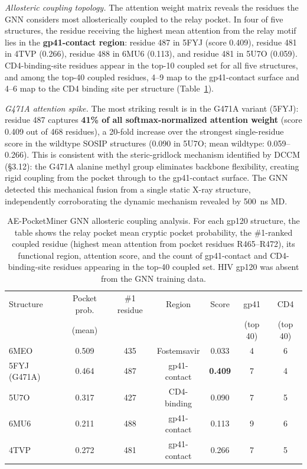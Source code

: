 \documentclass[11pt,a4paper]{article}
\begin{document}
\textit{Allosteric coupling topology.} The attention weight matrix reveals the residues the GNN considers most allosterically coupled to the relay pocket. In four of five structures, the residue receiving the highest mean attention from the relay motif lies in the \textbf{gp41-contact region}: residue 487 in 5FYJ (score 0.409), residue 481 in 4TVP (0.266), residue 488 in 6MU6 (0.113), and residue 481 in 5U7O (0.059). CD4-binding-site residues appear in the top-10 coupled set for all five structures, and among the top-40 coupled residues, 4--9 map to the gp41-contact surface and 4--6 map to the CD4 binding site per structure (Table~\ref{tab:gnn_coupling}).

\textit{G471A attention spike.} The most striking result is in the G471A variant (5FYJ): residue 487 captures \textbf{41\% of all softmax-normalized attention weight} (score 0.409 out of 468 residues), a 20-fold increase over the strongest single-residue score in the wildtype SOSIP structures (0.090 in 5U7O; mean wildtype: 0.059--0.266). This is consistent with the steric-gridlock mechanism identified by DCCM (\S3.12): the G471A alanine methyl group eliminates backbone flexibility, creating rigid coupling from the pocket through to the gp41-contact surface. The GNN detected this mechanical fusion from a single static X-ray structure, independently corroborating the dynamic mechanism revealed by 500~ns MD.

\begin{table}[htbp]
\centering
\caption{AE-PocketMiner GNN allosteric coupling analysis. For each gp120 structure, the table shows the relay pocket mean cryptic pocket probability, the \#1-ranked coupled residue (highest mean attention from pocket residues R465--R472), its functional region, attention score, and the count of gp41-contact and CD4-binding-site residues appearing in the top-40 coupled set. HIV gp120 was absent from the GNN training data.}
\label{tab:gnn_coupling}
\small
\begin{tabular}{@{}lcccccc@{}}
\toprule
Structure & Pocket prob. & \#1 residue & Region & Score & gp41 & CD4 \\
& (mean) & & & & (top 40) & (top 40) \\
\midrule
6MEO  & 0.509 & 435 & Fostemsavir & 0.033 & 4 & 6 \\
5FYJ (G471A)  & 0.464 & 487 & gp41-contact & \textbf{0.409} & 7 & 4 \\
5U7O  & 0.317 & 427 & CD4-binding  & 0.090 & 7 & 5 \\
6MU6  & 0.211 & 488 & gp41-contact & 0.113 & 9 & 6 \\
4TVP  & 0.272 & 481 & gp41-contact & 0.266 & 7 & 5 \\
\bottomrule
\end{tabular}
\end{table}
\end{document}
